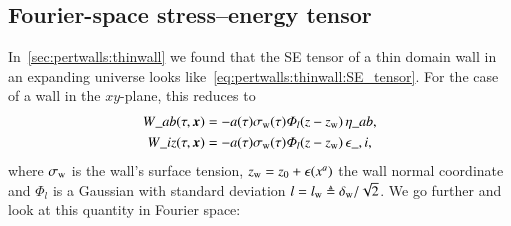 \subsection{Fourier-space stress--energy tensor}\label{sec:pertwalls:gws:Fourier_SE_tensor}
    In~\cref{sec:pertwalls:thinwall} we found that the SE tensor of a thin domain wall in an expanding universe looks like~\cref{eq:pertwalls:thinwall:SE_tensor}. For the case of a wall in the $xy$-plane, this reduces to
    \begin{equation}
        \begin{split}
            \Tw\_{ab}(\tau, \vec{x}) 
             &=  -a (\tau)\sigma\ped{w}(\tau) \varPhi_l(z-z\ped{w}) \, \eta\_{ab}, \\
            \Tw\_{iz}(\tau, \vec{x}) 
            &= -a (\tau)\sigma\ped{w}(\tau) \varPhi_l(z-z\ped{w} ) \,\epsilon\_{,i}, %
        \end{split}
    \end{equation}
    where $\sigma_\mathrm{w}$ is the wall's surface tension, $z\ped{w} = z_0 + \epsilon(x\^a)$ the wall normal coordinate and $\varPhi_l$ is a Gaussian with standard deviation $l= l_\mathrm{w} \triangleq \delta_\mathrm{w}/\sqrt{2}$. We go further and look at this quantity in Fourier space:
